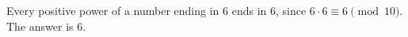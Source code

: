 Every positive power of a number ending in 6 ends in 6, since $6\cdot6\equiv6\pmod{10}$. The answer is $\boxed6$.
